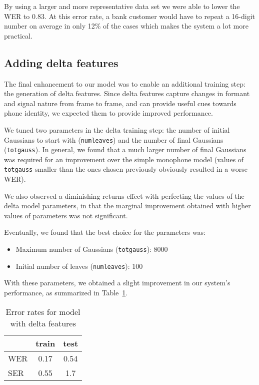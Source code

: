 \documentclass[11pt]{article}
\begin{document}
By using a larger and  more representative data set we were able to lower the
WER to 0.83. At this error rate, a bank customer would have to repeat a 16-digit
number on average in only 12\% of the cases which makes the system a lot more
practical.

\subsection{Adding delta features}

The final enhancement to our model was to enable an additional training step:
the generation of delta features. Since delta features capture changes in
formant and signal nature from frame to frame, and can provide useful cues
towards phone identity, we expected them to provide improved performance.

We tuned two parameters in the delta training step: the number of initial
Gaussians to start with (\texttt{numleaves}) and the number of final Gaussians
(\texttt{totgauss}). In general, we found that a much larger number of final
Gaussians was required for an improvement over the simple monophone model
(values of \texttt{totgauss} smaller than the ones chosen previously obviously
resulted in a worse WER).

We also observed a diminishing returns effect with perfecting the values of the
delta model parameters, in that the marginal improvement obtained with higher
values of parameters was not significant.

Eventually, we found that the best choice for the parameters was:
\begin{itemize}
  \item Maximum number of Gaussians (\texttt{totgauss}): 8000
  \item Initial number of leaves (\texttt{numleaves}): 100
\end{itemize}

With these parameters, we obtained a slight improvement in our system's
performance, as summarized in Table~\ref{tab:wer-delta}.

\begin{table}[h]\centering
  \begin{tabular}{lcc}
    \toprule
    & train & test \\
    \midrule
    WER & 0.17 & 0.54 \\
    SER & 0.55 & 1.7 \\
    \bottomrule
  \end{tabular}
  \caption{Error rates for model with delta features}\label{tab:wer-delta}
\end{table}
\end{document}

